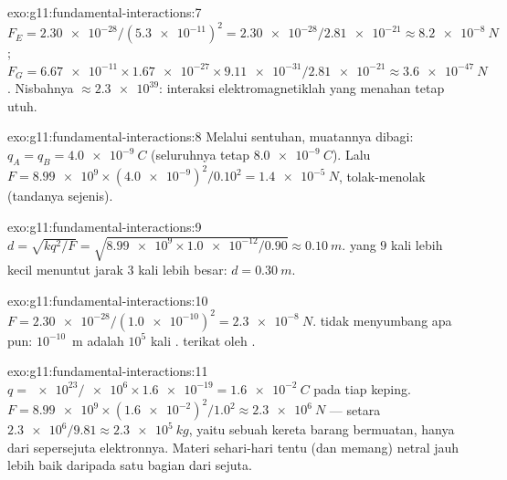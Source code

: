 \begin{solution}{exo:g11:fundamental-interactions:7}
$F_E = \num{2.30e-28}/(\num{5.3e-11})^2 = \num{2.30e-28}/\num{2.81e-21}
\approx \qty{8.2e-8}{N}$;
$F_G = \num{6.67e-11} \times \num{1.67e-27} \times \num{9.11e-31} /
\num{2.81e-21} \approx \qty{3.6e-47}{N}$. Nisbahnya
$\approx \num{2.3e39}$: interaksi elektromagnetiklah yang menahan 
tetap utuh.
\end{solution}

\begin{solution}{exo:g11:fundamental-interactions:8}
Melalui sentuhan, muatannya dibagi:
$q_A = q_B = \qty{+4.0e-9}{C}$ (seluruhnya tetap
$\qty{8.0e-9}{C}$). Lalu
$F = \num{8.99e9} \times (\num{4.0e-9})^2/0.10^2 =
\qty{1.4e-5}{N}$, tolak-menolak (tandanya sejenis).
\end{solution}

\begin{solution}{exo:g11:fundamental-interactions:9}
$d = \sqrt{k q^2/F} = \sqrt{\num{8.99e9} \times \num{1.0e-12}/0.90}
\approx \qty{0.10}{m}$.  yang $9$ kali lebih kecil menuntut jarak
$3$ kali lebih besar: $d = \qty{0.30}{m}$.
\end{solution}

\begin{solution}{exo:g11:fundamental-interactions:10}
$F = \num{2.30e-28}/(\num{1.0e-10})^2 = \qty{2.3e-8}{N}$.  tidak menyumbang apa pun: $10^{-10}$~m adalah $10^{5}$ kali
.  terikat oleh .
\end{solution}

\begin{solution}{exo:g11:fundamental-interactions:11}
$q = \num{e23}/\num{e6} \times \num{1.6e-19} = \qty{1.6e-2}{C}$ pada
tiap keping. $F = \num{8.99e9} \times (\num{1.6e-2})^2/1.0^2 \approx
\qty{2.3e6}{N}$ --- setara  $\num{2.3e6}/9.81 \approx
\qty{2.3e5}{kg}$, yaitu sebuah kereta barang bermuatan, hanya dari
sepersejuta elektronnya. Materi sehari-hari tentu (dan memang) netral
jauh lebih baik daripada satu bagian dari sejuta.
\end{solution}

